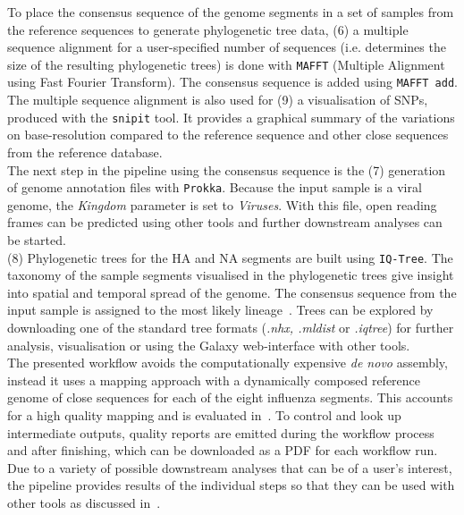 To place the consensus sequence of the genome segments in a set of samples from the reference sequences to generate phylogenetic tree data, (6) a multiple sequence alignment for a user-specified number of sequences (i.e. determines the size of the resulting phylogenetic trees) is done with \texttt{MAFFT} (Multiple Alignment using Fast Fourier Transform). The consensus sequence is added using \texttt{MAFFT add}. The multiple sequence alignment is also used for (9) a visualisation of SNPs, produced with the \texttt{snipit} tool. It provides a graphical summary of the variations on base-resolution compared to the reference sequence and other close sequences from the reference database. \\
The next step in the pipeline using the consensus sequence is the (7) generation of genome annotation files with \texttt{Prokka}. Because the input sample is a viral genome, the \textit{Kingdom} parameter is set to \textit{Viruses}. With this file, open reading frames can be predicted using other tools and further downstream analyses can be started. \\
(8) Phylogenetic trees for the \ac{HA} and \ac{NA} segments are built using \texttt{IQ-Tree}. The taxonomy of the sample segments visualised in the phylogenetic trees give insight into spatial and temporal spread of the genome. The consensus sequence from the input sample is assigned to the most likely lineage~\cite{minh2020iq}. Trees can be explored by downloading one of the standard tree formats (\textit{.nhx, .mldist} or \textit{.iqtree}) for further analysis, visualisation or using the Galaxy web-interface with other tools. \\
The presented workflow avoids the computationally expensive \textit{de novo} assembly, instead it uses a mapping approach with a dynamically composed reference genome of close sequences for each of the eight influenza segments. This accounts for a high quality mapping and is evaluated in~. To control and look up intermediate outputs, quality reports are emitted during the workflow process and after finishing, which can be downloaded as a \ac{PDF} for each workflow run. \\
Due to a variety of possible downstream analyses that can be of a user's interest, the pipeline provides results of the individual steps so that they can be used with other tools as discussed in~.

